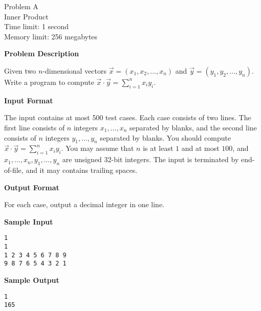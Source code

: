 \documentclass[11pt]{article}
\begin{document}
\begin{center}
    {\LARGE Problem A}\\
    {\Large Inner Product}\\
    {Time limit: 1 second}\\
    {Memory limit: 256 megabytes}
\end{center}

\textbf{\large Problem Description}

Given two $n$-dimensional vectors $\vec{x}=(x_1,x_2,\dots,x_n)$ and 
$\vec{y}=(y_1,y_2,\dots,y_n)$. Write a program to compute 
$\vec{x}\cdot\vec{y}=\sum_{i=1}^nx_iy_i$.

\textbf{\large Input Format}

The input contains at most 500 test cases. 
Each case consists of two lines. The first line consists of $n$ integers 
$x_1,\dots,x_n$ separated by blanks, and the second line consists of $n$ 
integers $y_1,\dots,y_n$ separated by blanks. 
You should compute  $\vec{x}\cdot\vec{y}=\sum_{i=1}^nx_iy_i$. 
You may assume that $n$ is at least $1$ and at most $100$,
and $x_1,\dots,x_n,y_1,\dots,y_n$ are unsigned 32-bit integers.
The input is terminated by end-of-file, and it may contains trailing spaces.

\textbf{\large Output Format}

For each case, output a decimal integer in one line.

\textbf{\large Sample Input}

\begin{verbatim}
1
1
1 2 3 4 5 6 7 8 9
9 8 7 6 5 4 3 2 1
\end{verbatim}

\textbf{\large Sample Output}
\begin{verbatim}
1
165
\end{verbatim}
\end{document}
